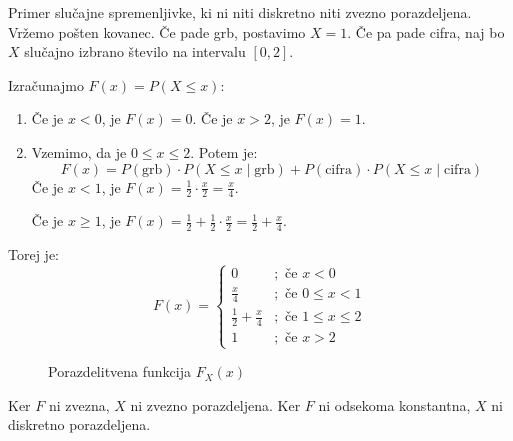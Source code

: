 \documentclass[12pt]{book}
\def\n{\noindent}
\theoremstyle{definition}
\theoremstyle{plain}
\theoremstyle{plain}
\theoremstyle{plain}
\theoremstyle{remark}
\begin{document}
\begin{zgled}
    Primer slučajne spremenljivke, ki ni niti diskretno niti zvezno porazdeljena. Vržemo pošten kovanec. Če pade grb, postavimo $X=1$. Če pa pade cifra, naj bo $X$ slučajno izbrano število na intervalu $[0,2]$.
    
    \n Izračunajmo $F(x)=P(X \leq x)$:
    \begin{enumerate}
        \item Če je $x<0$, je $F(x) = 0$. Če je $x>2$, je $F(x) = 1$.
        \item Vzemimo, da je $0 \leq x \leq 2$. Potem je:
        $$
        F(x) = P(\text{grb}) \cdot P(X\leq x \mid \text{grb}) + P(\text{cifra}) \cdot P(X\leq x \mid \text{cifra})
        $$
        Če je $x<1$, je $F(x)=\frac{1}{2} \cdot \frac{x}{2}=\frac{x}{4}$.

        Če je $x \geq 1$, je $F(x)=\frac{1}{2}+\frac{1}{2} \cdot \frac{x}{2}=\frac{1}{2}+\frac{x}{4}$.
    \end{enumerate}
  
    \n Torej je: 
    $$
    F(x)=
    \begin{cases}
        0 &; \text{ če } x<0 \\
        \frac{x}{4} &; \text{ če } 0 \leq x<1 \\
        \frac{1}{2}+\frac{x}{4} &; \text{ če } 1 \leq x \leq 2 \\
        1 &; \text{ če } x>2
    \end{cases}
    $$

    \begin{figure}[H]
        \centering

        \caption{Porazdelitvena funkcija $F_X(x)$}
        \label{fig:20}
    \end{figure}

    \n Ker $F$ ni zvezna, $X$ ni zvezno porazdeljena. Ker $F$ ni odsekoma konstantna, $X$ ni diskretno porazdeljena. 
\end{zgled}
\end{document}
